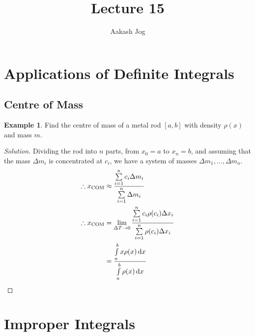 \documentclass[fleqn, a4paper, 12pt]{article}
\title{Lecture 15}
\author{Aakash Jog}
\date{\formatdate{18}{12}{2014}}
\theoremstyle{definition}
\newtheorem{example}{Example}
\theoremstyle{theorem}
\theoremstyle{remark}
\newenvironment{solution}
{\begin{proof}[Solution]\let\qed\relax}
	{\end{proof}}
\begin{document}
	
\maketitle

\tableofcontents

\newpage

\section{Applications of Definite Integrals}

\subsection{Centre of Mass}

\begin{example}
	Find the centre of mass of a metal rod $[a, b]$ with density $\rho(x)$ and mass $m$.
\end{example}

\begin{solution}
	Dividing the rod into $n$ parts, from $x_0 = a$ to $x_n = b$, and assuming that the mass $\Delta m_i$ is concentrated at $c_i$, we have a system of masses $\Delta m_1, \dots, \Delta m_n$.
	\begin{align*}
		\therefore x_{\text{COM}} &\approx \dfrac{\sum\limits_{i = 1}^{n} c_i \Delta m_i}{\sum\limits_{i = 1}^{n} \Delta m_i}\\
		\therefore x_{\text{COM}} &= \lim\limits_{\Delta T \to 0} \dfrac{\sum\limits_{i = 1}^{n} c_i \rho(c_i) \Delta x_i}{\sum\limits_{i = 1}^{n} \rho(c_i) \Delta x_i}\\
		&= \dfrac{\int\limits_{a}^{b} x \rho(x) \dif x}{\int\limits_{a}^{b}\rho(x) \dif x}
	\end{align*}
\end{solution}

\section{Improper Integrals}
\end{document}
